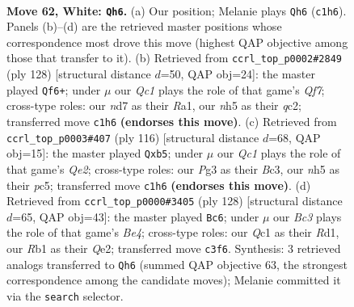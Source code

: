 \documentclass[11pt]{article}
\begin{document}
\clearpage

\begin{figure}[p]\centering
\begin{subfigure}{0.46\textwidth}\centering
\resizebox{\linewidth}{!}{%
\newchessgame
\chessboard[
  setfen={3q2k1/3n1p2/b2P4/7n/2p4P/p1B2pP1/P7/1RQ3K1 w - - 4 62},
  showmover=false,
  pgfstyle=straightmove, color=movearrow, markmove={c1-h6}
]}
\caption{}
\end{subfigure}\hfill
\begin{subfigure}{0.46\textwidth}\centering
\resizebox{\linewidth}{!}{%
\newchessgame
\chessboard[
  setfen={2b4k/5Q2/n2p3p/B2P1p1B/2P1pP2/6rP/2q5/R6K w - - 5 65},
  showmover=false,
  pgfstyle=straightmove, color=movearrow, markmove={f7-f6}
]}
\caption{}
\end{subfigure}
\\[4pt]
\begin{subfigure}{0.46\textwidth}\centering
\resizebox{\linewidth}{!}{%
\newchessgame
\chessboard[
  setfen={8/5k1p/4nP2/1ppq4/p6P/P1B3P1/4Q2K/8 w - - 1 59},
  showmover=false,
  pgfstyle=straightmove, color=movearrow, markmove={e2-b5}
]}
\caption{}
\end{subfigure}\hfill
\begin{subfigure}{0.46\textwidth}\centering
\resizebox{\linewidth}{!}{%
\newchessgame
\chessboard[
  setfen={2r3k1/6p1/1p1bp2p/1P2n3/2P1B3/q5PP/4Q2B/3R3K w - - 3 65},
  showmover=false,
  pgfstyle=straightmove, color=movearrow, markmove={e4-c6}
]}
\caption{}
\end{subfigure}
\caption{\textbf{Move 62, White: \texttt{Qh6}.} (a) Our position; Melanie plays \texttt{Qh6} (\texttt{c1h6}). Panels (b)--(d) are the retrieved master positions whose correspondence most drove this move (highest QAP objective among those that transfer to it). (b) Retrieved from \texttt{ccrl\_top\_p0002\#2849} (ply 128) [structural distance $d$=50, QAP obj=24]: the master played \texttt{Qf6+}; under $\mu$ our \emph{Qc1} plays the role of that game's \emph{Qf7}; cross-type roles: our \emph{n}d7 as their \emph{R}a1, our \emph{n}h5 as their \emph{q}c2; transferred move \texttt{c1h6} \textbf{(endorses this move)}. (c) Retrieved from \texttt{ccrl\_top\_p0003\#407} (ply 116) [structural distance $d$=68, QAP obj=15]: the master played \texttt{Qxb5}; under $\mu$ our \emph{Qc1} plays the role of that game's \emph{Qe2}; cross-type roles: our \emph{P}g3 as their \emph{B}c3, our \emph{n}h5 as their \emph{p}c5; transferred move \texttt{c1h6} \textbf{(endorses this move)}. (d) Retrieved from \texttt{ccrl\_top\_p0000\#3405} (ply 128) [structural distance $d$=65, QAP obj=43]: the master played \texttt{Bc6}; under $\mu$ our \emph{Bc3} plays the role of that game's \emph{Be4}; cross-type roles: our \emph{Q}c1 as their \emph{R}d1, our \emph{R}b1 as their \emph{Q}e2; transferred move \texttt{c3f6}. Synthesis: 3 retrieved analogs transferred to \texttt{Qh6} (summed QAP objective 63, the strongest correspondence among the candidate moves); Melanie committed it via the \texttt{search} selector.}
\label{fig:thought-m122}
\end{figure}
\end{document}
